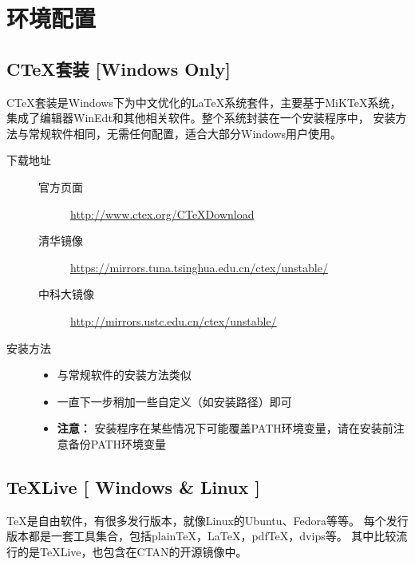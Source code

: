 \chapter{环境配置}

\section{C\TeX{}套装 [Windows Only]}

C\TeX{}套装是Windows下为中文优化的\LaTeX{}系统套件，主要基于MiKTeX系统，
集成了编辑器WinEdt和其他相关软件。整个系统封装在一个安装程序中，
安装方法与常规软件相同，无需任何配置，适合大部分Windows用户使用。

\begin{description}
	\item[下载地址] \hfill
	\begin{description}
		\item[官方页面]
		\url{http://www.ctex.org/CTeXDownload}
		\item[清华镜像]
		\url{https://mirrors.tuna.tsinghua.edu.cn/ctex/unstable/}
		\item[中科大镜像]
		\url{http://mirrors.ustc.edu.cn/ctex/unstable/}
	\end{description}
	\item[安装方法] \hfill
	\begin{itemize}
		\item[] 与常规软件的安装方法类似
		\item[] 一直下一步稍加一些自定义（如安装路径）即可
		\item[] {\bf 注意：} 安装程序在某些情况下可能覆盖PATH环境变量，请在安装前注意备份PATH环境变量
	\end{itemize}
\end{description}

\section{\TeX{}Live [ Windows \& Linux ]}

\TeX{}是自由软件，有很多发行版本，就像Linux的Ubuntu、Fedora等等。
每个发行版本都是一套工具集合，包括plain\TeX{}，\LaTeX{}，pdf\TeX{}，dvips等。
其中比较流行的是\TeX{}Live，也包含在CTAN的开源镜像中。

